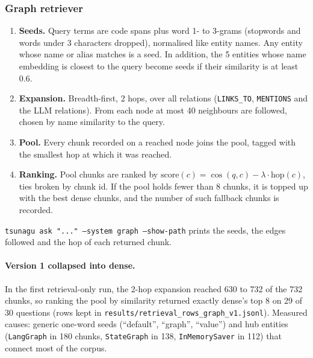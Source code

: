 \documentclass[11pt,a4paper]{article}
\newcommand{\code}[1]{\texttt{#1}}
\begin{document}
\subsubsection{Graph retriever}
\label{sec:graph-retriever}

\begin{enumerate}
  \item \textbf{Seeds.} Query terms are code spans plus word 1- to 3-grams (stopwords and words
  under 3 characters dropped), normalised like entity names. Any entity whose name or alias
  matches is a seed. In addition, the 5 entities whose name embedding is closest to the query
  become seeds if their similarity is at least 0.6.
  \item \textbf{Expansion.} Breadth-first, 2 hops, over all relations (\code{LINKS\_TO},
  \code{MENTIONS} and the LLM relations). From each node at most 40 neighbours are followed,
  chosen by name similarity to the query.
  \item \textbf{Pool.} Every chunk recorded on a reached node joins the pool, tagged with the
  smallest hop at which it was reached.
  \item \textbf{Ranking.} Pool chunks are ranked by
  \( \mathrm{score}(c) = \cos(q, c) - \lambda \cdot \mathrm{hop}(c) \), ties broken by chunk id.
  If the pool holds fewer than 8 chunks, it is topped up with the best dense chunks, and the
  number of such fallback chunks is recorded.
\end{enumerate}
\code{tsunagu ask "..." --system graph --show-path} prints the seeds, the edges followed and the
hop of each returned chunk.

\paragraph{Version 1 collapsed into dense.} In the first retrieval-only run, the 2-hop expansion
reached 630 to 732 of the 732 chunks, so ranking the pool by similarity returned exactly dense's
top 8 on 29 of 30 questions (rows kept in \code{results/retrieval\_rows\_graph\_v1.jsonl}).
Measured causes: generic one-word seeds (``default'', ``graph'', ``value'') and hub entities
(\code{LangGraph} in 180 chunks, \code{StateGraph} in 138, \code{InMemorySaver} in 112) that
connect most of the corpus.
\end{document}
